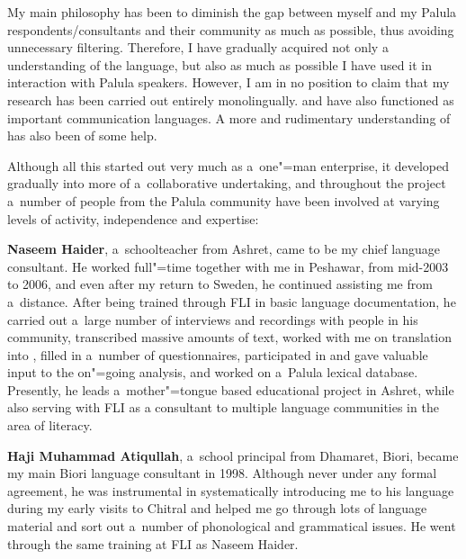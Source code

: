 My main philosophy has been to diminish the gap between myself and my Palula respondents/consultants
and their community as much as possible, thus avoiding unnecessary filtering. Therefore, I have
gradually acquired not only a~ understanding of the language, but also as much as possible I
have used it in interaction with Palula speakers. However, I am in no position to claim that my
research has been carried out entirely monolingually. \iliEnglish and \iliPashto have also functioned as important
communication languages. A more  and rudimentary understanding of \iliUrdu has also been of some
help.


Although all this started out very much as a~one"=man enterprise, it developed gradually into more of
a~collaborative undertaking, and throughout the project a~number of people from the Palula community
have been involved at varying levels of activity, independence and expertise:


\textbf{Naseem Haider}, a~schoolteacher from Ashret, came to be my chief language consultant. He
worked full"=time together with me in Peshawar, from mid-2003 to 2006, and even after my return to
Sweden, he continued assisting me from a~distance. After being trained through FLI in basic language documentation, he carried out a~large number of interviews and
recordings with people in his community, transcribed massive amounts of text, worked with me on
translation into \iliEnglish, filled in a~number of questionnaires, participated in and gave valuable
input to the on"=going analysis, and worked on a~Palula lexical database. Presently, he leads a~mother"=tongue based educational project in Ashret, while also serving with FLI as a consultant to multiple language communities in the area of literacy.


\textbf{Haji Muhammad Atiqullah}, a~school principal from Dhamaret, Biori, became my main Biori language
consultant in 1998. Although never under any formal agreement, he was instrumental in systematically
introducing me to his language during my early visits to Chitral and helped me go through lots of
language material and sort out a~number of phonological and grammatical issues. He went through the
same training at FLI as Naseem Haider.

